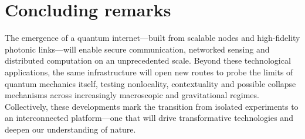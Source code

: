 \documentclass[../Thesis-IJspeert.tex]{subfiles}
\begin{document}
\section{Concluding remarks}
The emergence of a quantum internet---built from scalable nodes and high-fidelity photonic links---will enable secure communication, networked sensing and distributed computation on an unprecedented scale. Beyond these technological applications, the same infrastructure will open new routes to probe the limits of quantum mechanics itself, testing nonlocality, contextuality and possible collapse mechanisms across increasingly macroscopic and gravitational regimes. Collectively, these developments mark the transition from isolated experiments to an interconnected platform---one that will drive transformative technologies and deepen our understanding of nature.
\end{document}
